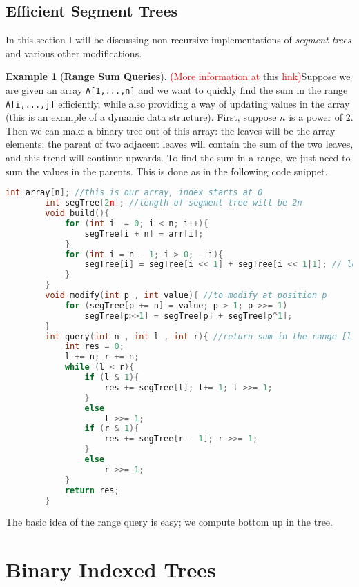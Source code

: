\documentclass[12pt,a4paper]{amsart}
\numberwithin{equation}{section}
\theoremstyle{definition}
\newtheorem{Ex}{Example}[section]
\begin{document}
\subsection{Efficient Segment Trees} In this section I will be discussing non-recursive implementations of \textit{segment trees} and various other modifications. 

\begin{Ex}[\textbf{Range Sum Queries}]
    \textcolor{red}{(More information at \href{https://codeforces.com/blog/entry/18051}{this} link)}Suppose we are given an array \verb|A[1,...,n]| and we want to quickly find the sum in the range \verb|A[i,...,j]| efficiently, while also providing a way of updating values in the array (this is an example of a dynamic data structure). First, suppose $n$ is a power of $2$. Then we can make a binary tree out of this array: the leaves will be the array elements; the parent of two adjacent leaves will contain the sum of the two leaves, and this trend will continue upwards. To find the sum in a range, we just need to sum the values in the parents. This is done as in the following code snippet.
    \begin{lstlisting}[language=C++]
        int array[n]; //this is our array, index starts at 0
        int segTree[2n]; //length of segment tree will be 2n
        void build(){
            for (int i  = 0; i < n; i++){
                segTree[i + n] = arr[i];
            }
            for (int i = n - 1; i > 0; --i){
                segTree[i] = segTree[i << 1] + segTree[i << 1|1]; // left shift operator to multiply by 2
            }
        }
        void modify(int p , int value){ //to modify at position p
            for (segTree[p += n] = value; p > 1; p >>= 1) 
                segTree[p>>1] = segTree[p] + segTree[p^1];
        }
        int query(int n , int l , int r){ //return sum in the range [l , r)
            int res = 0;
            l += n; r += n;
            while (l < r){
                if (l & 1){
                    res += segTree[l]; l+= 1; l >>= 1;
                }
                else
                    l >>= 1;
                if (r & 1){
                    res += segTree[r - 1]; r >>= 1;
                }
                else
                    r >>= 1;
            }
            return res;
        }
    \end{lstlisting}
    The basic idea of the range query is easy; we compute bottom up in the tree.
\end{Ex}

\section{Binary Indexed Trees}
\end{document}
